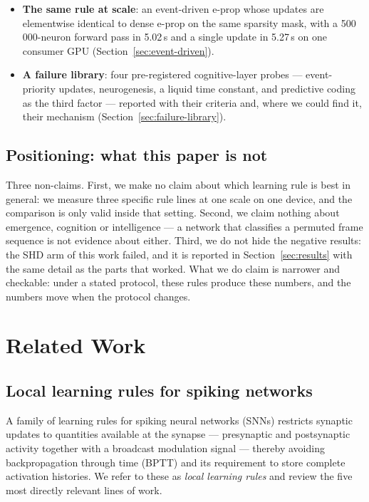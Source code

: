 \documentclass[11pt]{article}
\begin{document}
\begin{itemize}
    state response thirty-fold and leaves the policy's angle dependence at zero
    (Section~\ref{sec:spiking-diagnostics}).
  \item \textbf{The same rule at scale}: an event-driven e-prop whose updates are
    elementwise identical to dense e-prop on the same sparsity mask, with a
    500\,000-neuron forward pass in 5.02\,s and a single update in 5.27\,s on one
    consumer GPU (Section~\ref{sec:event-driven}).
  \item \textbf{A failure library}: four pre-registered cognitive-layer probes ---
    event-priority updates, neurogenesis, a liquid time constant, and predictive
    coding as the third factor --- reported with their criteria and, where we
    could find it, their mechanism (Section~\ref{sec:failure-library}).
\end{itemize}

\subsection{Positioning: what this paper is not}
Three non-claims. First, we make no claim about which learning rule is best in
general: we measure three specific rule lines at one scale on one device, and
the comparison is only valid inside that setting. Second, we claim nothing about
emergence, cognition or intelligence --- a network that classifies a permuted
frame sequence is not evidence about either. Third, we do not hide the negative
results: the SHD arm of this work failed, and it is reported in Section~\ref{sec:results}
with the same detail as the parts that worked. What we do claim is narrower and
checkable: under a stated protocol, these rules produce these numbers, and the
numbers move when the protocol changes.

\section{Related Work}
\label{sec:related}
\subsection{Local learning rules for spiking networks}
A family of learning rules for spiking neural networks (SNNs) restricts synaptic
updates to quantities available at the synapse --- presynaptic and postsynaptic
activity together with a broadcast modulation signal --- thereby avoiding
backpropagation through time (BPTT) and its requirement to store complete
activation histories. We refer to these as \emph{local learning rules} and
review the five most directly relevant lines of work.
\end{document}
